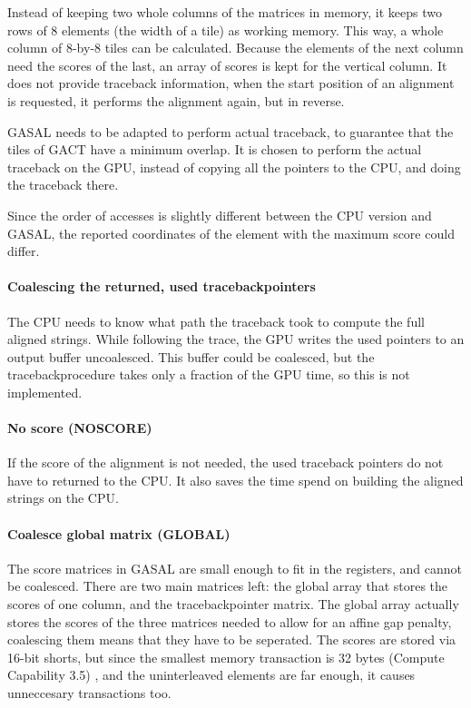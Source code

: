 \documentclass[../main/thesis.tex]{subfiles}
\begin{document}
Instead of keeping two whole columns of the matrices in memory, it keeps two rows of 8 elements (the width of a tile) as working memory.
This way, a whole column of 8-by-8 tiles can be calculated.
Because the elements of the next column need the scores of the last, an array of scores is kept for the vertical column.
It does not provide traceback information, when the start position of an alignment is requested, it performs the alignment again, but in reverse.

GASAL needs to be adapted to perform actual traceback, to guarantee that the tiles of GACT have a minimum overlap.
It is chosen to perform the actual traceback on the GPU, instead of copying all the pointers to the CPU, and doing the traceback there.

Since the order of accesses is slightly different between the CPU version and GASAL, the reported coordinates of the element with the maximum score could differ.



\paragraph{Coalescing the returned, used tracebackpointers}
The CPU needs to know what path the traceback took to compute the full aligned strings.
While following the trace, the GPU writes the used pointers to an output buffer uncoalesced.
This buffer could be coalesced, but the tracebackprocedure takes only a fraction of the GPU time, so this is not implemented.

\paragraph{No score (NOSCORE)}
If the score of the alignment is not needed, the used traceback pointers do not have to returned to the CPU.
It also saves the time spend on building the aligned strings on the CPU.


\paragraph{Coalesce global matrix (GLOBAL)}
The score matrices in GASAL are small enough to fit in the registers, and cannot be coalesced.
There are two main matrices left: the global array that stores the scores of one column, and the tracebackpointer matrix.
The global array actually stores the scores of the three matrices needed to allow for an affine gap penalty, coalescing them means that they have to be seperated.
The scores are stored via 16-bit shorts, but since the smallest memory transaction is 32 bytes (Compute Capability 3.5) \cite{cuda}, and the uninterleaved elements are far enough, it causes unneccesary transactions too.
\end{document}
